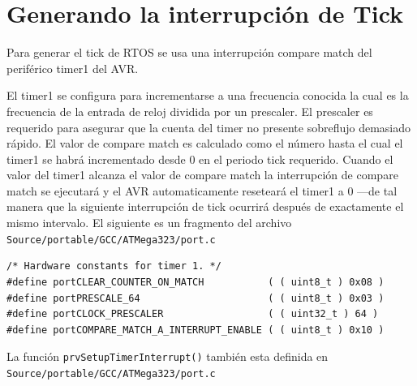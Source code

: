 \documentclass[12pt]{article}
\begin{document}
\section{Generando la interrupción de Tick}
Para generar el tick de RTOS se usa una interrupción compare match del 
periférico timer1 del AVR.

El timer1 se configura para incrementarse a una frecuencia conocida la 
cual es la frecuencia de la entrada de reloj dividida por un prescaler. 
El prescaler es requerido para asegurar que la cuenta del timer no 
presente sobreflujo demasiado rápido. El valor de compare match es 
calculado como el número hasta el cual el timer1 se habrá incrementado 
desde 0 en el periodo tick requerido. Cuando el valor del timer1 
alcanza el valor de compare match la interrupción de compare match se 
ejecutará y el AVR automaticamente reseteará el timer1 a 0 ---de tal 
manera que la siguiente interrupción de tick ocurrirá después de 
exactamente el mismo intervalo. El siguiente es un fragmento del archivo 
{\tt Source/portable/GCC/ATMega323/port.c}
\begin{verbatim}
/* Hardware constants for timer 1. */
#define portCLEAR_COUNTER_ON_MATCH           ( ( uint8_t ) 0x08 )
#define portPRESCALE_64                      ( ( uint8_t ) 0x03 )
#define portCLOCK_PRESCALER                  ( ( uint32_t ) 64 )
#define portCOMPARE_MATCH_A_INTERRUPT_ENABLE ( ( uint8_t ) 0x10 )
\end{verbatim}
La función {\tt prvSetupTimerInterrupt()} también esta def\/inida en \\
{\tt Source/portable/GCC/ATMega323/port.c}
\eject
\end{document}
